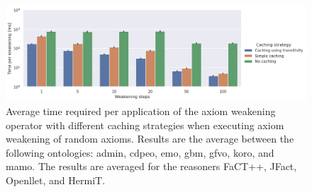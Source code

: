 \begin{figure}[htbp]
  \centering
  \includegraphics[width=\textwidth]{resources/time-cache-bar.png}
  \caption{Average time required per application of the axiom weakening operator with different caching strategies when executing axiom weakening of random axioms. Results are the average between the following ontologies: admin, cdpeo, emo, gbm, gfvo, koro, and mamo. The results are averaged for the reasoners FaCT++, JFact, Openllet, and HermiT.}
\end{figure}

